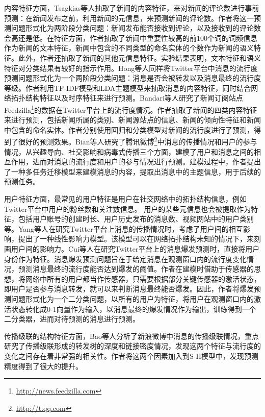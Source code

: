 内容特征方面，Tsagkias等人\citep{tsagkias2009predicting}抽取了新闻的内容特征，来对新闻的评论数进行事前预测：在新闻发布之前，利用新闻的元信息，来预测新闻的评论数。作者将这一预测问题形式化为两阶段分类问题：新闻发布能否接收到评论，以及接收到的评论数会高还是低。在特征方面，作者抽取了新闻中重要性较高的前100个词的词频信息作为新闻的文本特征，新闻中包含的不同类型的命名实体的个数作为新闻的语义特征。此外，作者还抽取了新闻的其他元信息特征。实验结果表明，文本特征和语义特征对分类结果有较好的指示作用。Hong等人\citep{hong2011predicting}同样将Twitter平台中消息的流行度预测问题形式化为一个两阶段分类问题：消息是否会被转发以及消息最终的流行度等级。作者利用TF-IDF模型和LDA主题模型\citep{blei2003latent}来抽取消息的内容特征，同时结合网络拓扑结构特征以及时序特征来进行预测。Bandari等人\citep{bandari2012pulse}研究了新闻订阅站点Feedzilla\footnote{\url{http://news.feedzilla.com}}的数据在Twitter平台上的流行度情况。作者抽取了新闻的四类内容特征来进行预测，包括新闻所属的类别、新闻源站点的信息、新闻的倾向性特征和新闻中包含的命名实体。作者分别使用回归和分类模型对新闻的流行度进行了预测，得到了很好的预测效果。Bian等人\citep{bian2014predicting}研究了腾讯微博\footnote{\url{http://t.qq.com}}中消息的传播情况和用户的参与情况，从兴趣导向、社交影响和病毒式传播三个方面，建模了用户和消息之间的相互作用，进而对消息的流行度和用户的参与情况进行预测。建模过程中，作者提出了一种多任务迁移模型来建模消息的内容，提取出消息中的主题信息，用于后续的预测任务。

用户特征方面，最常见的用户特征是用户在社交网络中的拓扑结构信息，例如Twitter平台中用户的粉丝数和关注数信息\citep{gupta2012predicting,zhao2013short,kupavskii2013predicting,kong2014predicting}。 用户的某些元信息也会被提取作为特征，包括用户账号的创建时长、用户历史发布的消息数\citep{suh2010want}、视频网站中的用户类别\citep{borghol2012untold}等。Yang等人\citep{yang2010modeling}在研究Twitter平台上消息的传播情况时，考虑了用户间的相互影响，提出了一种线性影响力模型。该模型可以在网络拓扑结构未知的情况下，来刻画用户间的影响力。Cui等人\citep{cui2013cascading}在研究Twitter平台上的消息爆发预测时，直接将用户身份作为特征。消息爆发预测问题旨在于给定消息在观测窗口内的流行度变化情况，预测消息最终的流行度能否达到爆发的阈值。作者在建模时借助于传感器的思想，将网络中所有的用户都当作传感器，只需要根据部分关键传感器的激活状态，即用户是否参与消息转发，就可以来判断消息最终能否爆发。因此，作者将爆发预测问题形式化为一个二分类问题，以所有的用户为特征，将用户在观测窗口内的激活状态转化成0-1向量作为输入，以消息最终的爆发情况作为输出，训练得到一个二分类器，进而对待预测的消息进行预测。

传播级联的结构特征方面，Bao等人\citep{bao2013popularity}分析了新浪微博中消息的传播级联情况，重点研究了传播级联形成的转发树的深度和链接密度情况，发现这两个特征与流行度的变化之间存在着非常强的相关性。作者将这两个因素加入到S-H模型中，发现预测精度得到了很大的提升。

